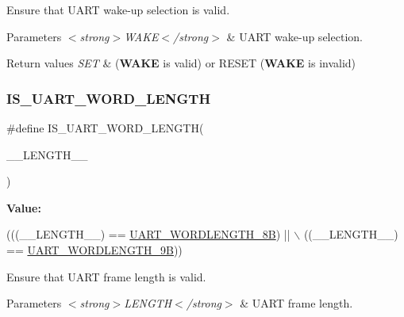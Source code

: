 Ensure that U\+A\+RT wake-\/up selection is valid. 


\begin{DoxyParams}{Parameters}
{\em $<$strong$>$\+W\+A\+K\+E$<$/strong$>$} & U\+A\+RT wake-\/up selection. \\
\hline
\end{DoxyParams}

\begin{DoxyRetVals}{Return values}
{\em S\+ET} & ({\bfseries W\+A\+KE} is valid) or R\+E\+S\+ET ({\bfseries W\+A\+KE} is invalid) \\
\hline
\end{DoxyRetVals}
\mbox{\label{group___u_a_r_t_ex___private___macros_gaf856254e5a61d2ee81086918bffabde5}} 
\subsubsection{\texorpdfstring{I\+S\+\_\+\+U\+A\+R\+T\+\_\+\+W\+O\+R\+D\+\_\+\+L\+E\+N\+G\+TH}{IS\_UART\_WORD\_LENGTH}}
{\footnotesize\ttfamily \#define I\+S\+\_\+\+U\+A\+R\+T\+\_\+\+W\+O\+R\+D\+\_\+\+L\+E\+N\+G\+TH(\begin{DoxyParamCaption}\item[{}]{\+\_\+\+\_\+\+L\+E\+N\+G\+T\+H\+\_\+\+\_\+ }\end{DoxyParamCaption})}

{\bfseries Value\+:}
\begin{DoxyCode}
(((\_\_LENGTH\_\_) == \hyperlink{group___u_a_r_t_ex___word___length_gaf394e9abaf17932ee89591f990fe6407}{UART\_WORDLENGTH\_8B}) || \(\backslash\)
                                         ((\_\_LENGTH\_\_) == \hyperlink{group___u_a_r_t_ex___word___length_gaf867be43de35fd3c32fe0b4dd4058f7e}{UART\_WORDLENGTH\_9B}))
\end{DoxyCode}


Ensure that U\+A\+RT frame length is valid. 


\begin{DoxyParams}{Parameters}
{\em $<$strong$>$\+L\+E\+N\+G\+T\+H$<$/strong$>$} & U\+A\+RT frame length. \\
\hline
\end{DoxyParams}

